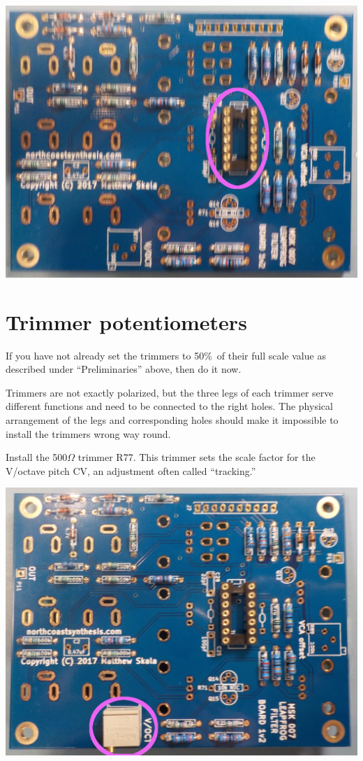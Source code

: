 \noindent\includegraphics[width=\linewidth]{dip14-1.jpg}

\section{Trimmer potentiometers}

If you have not already set the trimmers to 50\%\ of their full scale value
as described under ``Preliminaries'' above, then do it now.

Trimmers are not exactly polarized, but the three legs of each trimmer serve
different functions and need to be connected to the right holes.  The
physical arrangement of the legs and corresponding holes should make it
impossible to install the trimmers wrong way round.

Install the 500$\Omega$ trimmer R77.  This trimmer sets the scale factor for
the V/octave pitch CV, an adjustment often called ``tracking.''

\nopagebreak
\noindent\includegraphics[width=\linewidth]{pot-500w1.jpg}

